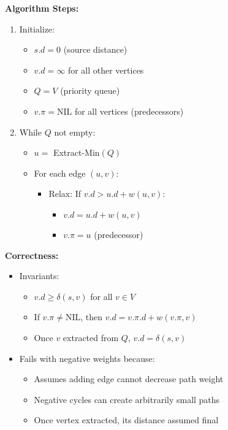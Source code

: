 \textbf{Algorithm Steps:}
\begin{enumerate}[noitemsep]
    \item Initialize:
        \begin{itemize}[noitemsep]
            \item $s.d = 0$ (source distance)
            \item $v.d = \infty$ for all other vertices
            \item $Q = V$ (priority queue)
            \item $v.\pi = \text{NIL}$ for all vertices (predecessors)
        \end{itemize}
    \item While $Q$ not empty:
        \begin{itemize}[noitemsep]
            \item $u = $ Extract-Min$(Q)$
            \item For each edge $(u,v)$:
                \begin{itemize}[noitemsep]
                    \item Relax: If $v.d > u.d + w(u,v)$:
                        \begin{itemize}[noitemsep]
                            \item $v.d = u.d + w(u,v)$
                            \item $v.\pi = u$ (predecessor)
                        \end{itemize}
                \end{itemize}
        \end{itemize}
\end{enumerate}

\textbf{Correctness:}
\begin{itemize}[noitemsep]
    \item Invariants:
        \begin{itemize}[noitemsep]
            \item $v.d \geq \delta(s,v)$ for all $v \in V$
            \item If $v.\pi \neq \text{NIL}$, then $v.d = v.\pi.d + w(v.\pi,v)$
            \item Once $v$ extracted from $Q$, $v.d = \delta(s,v)$
        \end{itemize}
    \item Fails with negative weights because:
        \begin{itemize}[noitemsep]
            \item Assumes adding edge cannot decrease path weight
            \item Negative cycles can create arbitrarily small paths
            \item Once vertex extracted, its distance assumed final
        \end{itemize}
\end{itemize}

